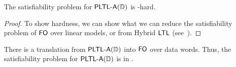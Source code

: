 \begin{theorem}
 The satisfiability problem for ${\rm\textsf{PLTL-A}}(\mathbb{D})$ is \tower-hard.
\end{theorem}

\begin{proof}
    To show hardness, we can show what we can reduce the satisfiability problem of ${\rm\textsf{FO}}$ over linear models, or from Hybrid ${\rm\textsf{LTL}}$ (see~\cite{FranceschetRS03}).

\end{proof}

\begin{conjecture}
    There is a translation from ${\rm\textsf{PLTL-A}}(\mathbb{D})$ into ${\rm\textsf{FO}}$ over data words. Thus, the satisfiability problem for ${\rm\textsf{PLTL-A}}(\mathbb{D})$ is in \ack.
\end{conjecture}

